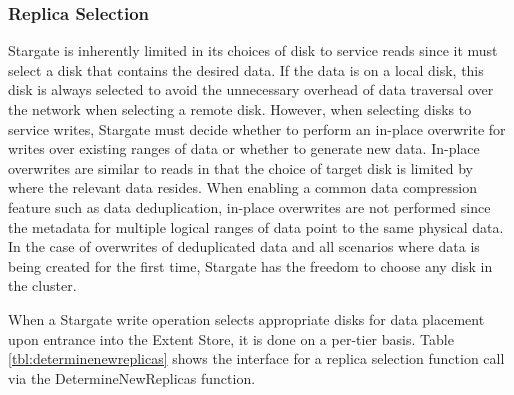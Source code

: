 \documentclass[12pt]{article}
\begin{document}
    \subsubsection{Replica Selection} \label{sec:replica-selection}

    Stargate is inherently limited in its choices of disk to service reads
    since it must select a disk that contains the desired data. If the data is
    on a local disk, this disk is always selected to avoid the unnecessary
    overhead of data traversal over the network when selecting a remote disk.
    However, when selecting disks to service writes, Stargate must decide
    whether to perform an in-place overwrite for writes over existing ranges of
    data or whether to generate new data. In-place overwrites are similar to
    reads in that the choice of target disk is limited by where the relevant
    data resides. When enabling a common data compression feature such as data
    deduplication, in-place overwrites are not performed since the metadata for
    multiple logical ranges of data point to the same physical data. In the
    case of overwrites of deduplicated data and all scenarios where data is
    being created for the first time, Stargate has the freedom to choose any
    disk in the cluster.

    When a Stargate write operation selects appropriate disks for data
    placement upon entrance into the Extent Store, it is done on a per-tier
    basis. Table \ref{tbl:determinenewreplicas} shows the interface for a
    replica selection function call via the DetermineNewReplicas function.
\end{document}
